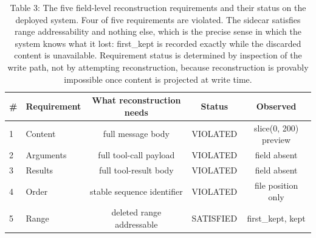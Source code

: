 \begin{table}[t]
\centering
\caption{Table 3: The five field-level reconstruction requirements and their status on the deployed system. Four of five requirements are violated. The sidecar satisfies range addressability and nothing else, which is the precise sense in which the system knows what it lost: first_kept is recorded exactly while the discarded content is unavailable. Requirement status is determined by inspection of the write path, not by attempting reconstruction, because reconstruction is provably impossible once content is projected at write time.}
\label{tab:field_requirements}
\begin{tabular}{llccc}
\toprule
\textbf{#} & \textbf{Requirement} & \textbf{What reconstruction needs} & \textbf{Status} & \textbf{Observed} \\
\midrule
1 & Content & full message body & VIOLATED & slice(0, 200) preview \\
2 & Arguments & full tool-call payload & VIOLATED & field absent \\
3 & Results & full tool-result body & VIOLATED & field absent \\
4 & Order & stable sequence identifier & VIOLATED & file position only \\
5 & Range & deleted range addressable & SATISFIED & first_kept, kept \\
\bottomrule
\end{tabular}
\end{table}
